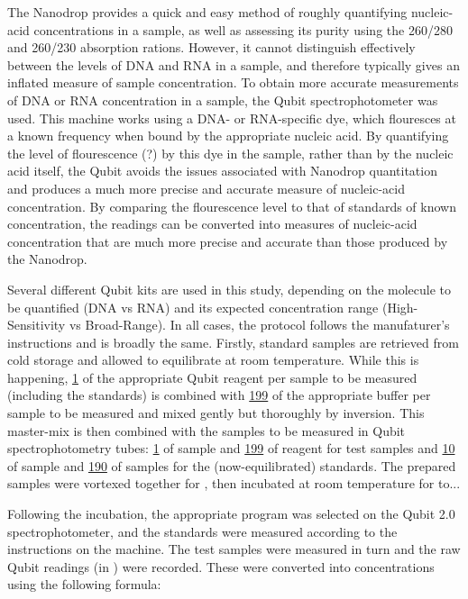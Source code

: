The Nanodrop provides a quick and easy method of roughly quantifying nucleic-acid concentrations in a sample, as well as assessing its purity using the 260/280 and 260/230 absorption rations. However, it cannot distinguish effectively between the levels of DNA and RNA in a sample, and therefore typically gives an inflated measure of sample concentration. To obtain more accurate measurements of DNA or RNA concentration in a sample, the Qubit spectrophotometer was used. %
This machine works using a DNA- or RNA-specific dye, which flouresces at a known frequency when bound by the appropriate nucleic acid. %
By quantifying the level of flourescence (?) by this dye in the sample, rather than by the nucleic acid itself, the Qubit avoids the issues associated with Nanodrop quantitation and produces a much more precise and accurate measure of nucleic-acid concentration. By comparing the flourescence level to that of standards of known concentration, the readings can be converted into measures of nucleic-acid concentration that are much more precise and accurate than those produced by the Nanodrop.

Several different Qubit kits are used in this study, depending on the molecule to be quantified (DNA vs RNA) and its expected concentration range (High-Sensitivity vs Broad-Range). In all cases, the protocol follows the manufaturer's instructions %
and is broadly the same. Firstly, standard samples are retrieved from cold storage and allowed to equilibrate at room temperature. While this is happening, \ul{1} of the appropriate Qubit reagent per sample to be measured (including the standards) is combined with \ul{199} of the appropriate buffer per sample to be measured and mixed gently but thoroughly by inversion. This master-mix is then combined with the samples to be measured in Qubit spectrophotometry tubes: \ul{1} of sample and \ul{199} of reagent for test samples and \ul{10} of sample and \ul{190} of samples for the (now-equilibrated) standards. The prepared samples were vortexed together for , then incubated at room temperature for  to... %

Following the incubation, the appropriate program was selected on the Qubit 2.0 spectrophotometer, and the standards were measured according to the instructions on the machine. The test samples were measured in turn and the raw Qubit readings (in \ngml{}) were recorded. These were converted into \ngul{} concentrations using the following formula:

